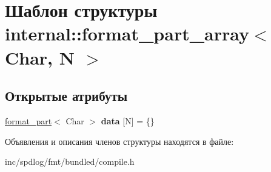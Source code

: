 \hypertarget{structinternal_1_1format__part__array}{}\section{Шаблон структуры internal\+:\+:format\+\_\+part\+\_\+array$<$ Char, N $>$}
\label{structinternal_1_1format__part__array}
\subsection*{Открытые атрибуты}
\begin{DoxyCompactItemize}
\item 
\mbox{\label{structinternal_1_1format__part__array_a8616efb01e293ba4c0c45450b7d93174}} 
\hyperlink{structinternal_1_1format__part}{format\+\_\+part}$<$ Char $>$ {\bfseries data} \mbox{[}N\mbox{]} = \{\}
\end{DoxyCompactItemize}


Объявления и описания членов структуры находятся в файле\+:\begin{DoxyCompactItemize}
\item 
inc/spdlog/fmt/bundled/compile.\+h\end{DoxyCompactItemize}
